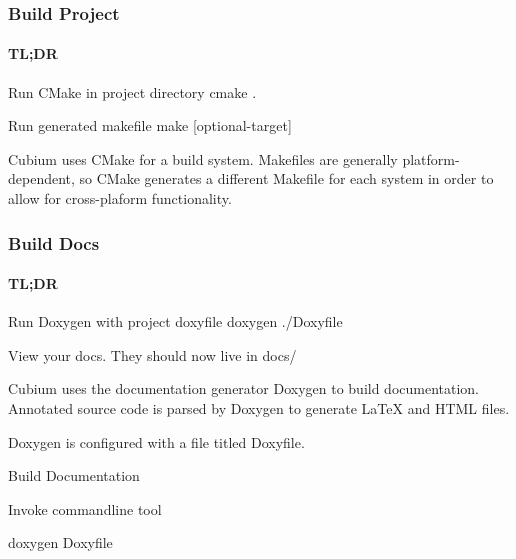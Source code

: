 \subsubsection*{Build Project}

\paragraph*{TL;DR}


\begin{DoxyItemize}
\item Run C\+Make in project directory {\ttfamily cmake .}
\item Run generated makefile {\ttfamily make \mbox{[}optional-\/target\mbox{]}}
\end{DoxyItemize}

Cubium uses C\+Make for a build system. Makefiles are generally platform-\/dependent, so C\+Make generates a different Makefile for each system in order to allow for cross-\/plaform functionality.

\subsubsection*{Build Docs}

\paragraph*{TL;DR}


\begin{DoxyItemize}
\item Run Doxygen with project doxyfile {\ttfamily doxygen ./\+Doxyfile}
\item View your docs. They should now live in {\ttfamily docs/}
\end{DoxyItemize}

Cubium uses the documentation generator Doxygen to build documentation. Annotated source code is parsed by Doxygen to generate La\+TeX and H\+T\+ML files.

Doxygen is configured with a file titled {\ttfamily Doxyfile}.


\begin{DoxyItemize}
\item Build Documentation
\begin{DoxyItemize}
\item Invoke commandline tool
\begin{DoxyItemize}
\item {\ttfamily doxygen Doxyfile}
\end{DoxyItemize}
\end{DoxyItemize}
\end{DoxyItemize}

